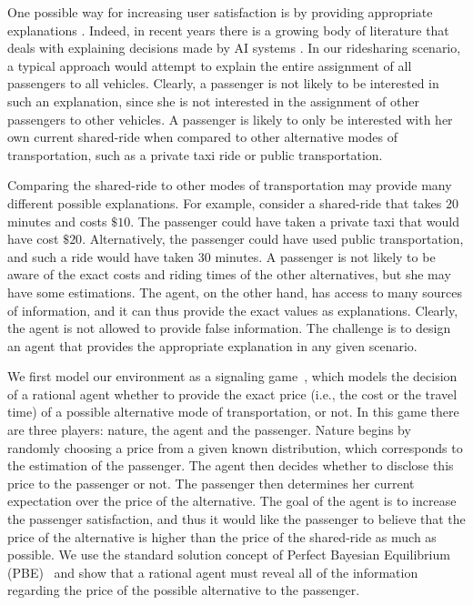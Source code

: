 \documentclass[letterpaper]{article} %
\begin{document}
One possible way for increasing user satisfaction is by providing appropriate explanations \cite{bradley2009dealing}. Indeed, in recent years there is a growing body of literature that deals with explaining decisions made by AI systems \cite{gunning2017explainable}.
In our ridesharing scenario, a typical %
approach would attempt to explain the entire assignment of all passengers to all vehicles. Clearly, a passenger is not likely to be interested in such an explanation, since she is not interested in the assignment of other passengers to other vehicles.
A passenger is likely to only be interested with her own current shared-ride when compared to other alternative modes of transportation, such as a private taxi ride or public transportation.

Comparing the shared-ride to other modes of transportation may provide many different possible explanations.
For example, consider a shared-ride that takes $20$ minutes and costs $\$10$. The passenger could have taken a private taxi that would have cost $\$20$. Alternatively, the passenger could have used public transportation, and such a ride would have taken $30$ minutes. A passenger is not likely to be aware of the exact costs and riding times of the other alternatives, but she may have some estimations. The agent, on the other hand, has access to many sources of information, and it can thus provide the exact values as explanations. Clearly, the agent is not allowed to provide false information. The challenge is to design an agent that provides the appropriate explanation in any given scenario.

We first model our environment as a signaling game~\cite{spence1974market}, which models the decision of a rational agent whether to provide the exact price (i.e., the cost or the travel time) of a possible alternative mode of transportation, or not.
In this game there are three players: nature, the agent and the passenger.
Nature begins by randomly choosing a price from a given known distribution, which corresponds to the estimation of the passenger.
The agent then decides whether to disclose this price to the passenger or not. The passenger then determines her current expectation over the price of the alternative. The goal of the agent is to increase the passenger satisfaction, and thus it would like the passenger to believe that the price of the alternative is higher than the price of the shared-ride as much as possible. We use the standard solution concept of Perfect Bayesian Equilibrium (PBE)~\cite{fudenberg1991perfect} and show that a rational agent must reveal all of the information regarding the price of the possible alternative to the passenger.
\end{document}
